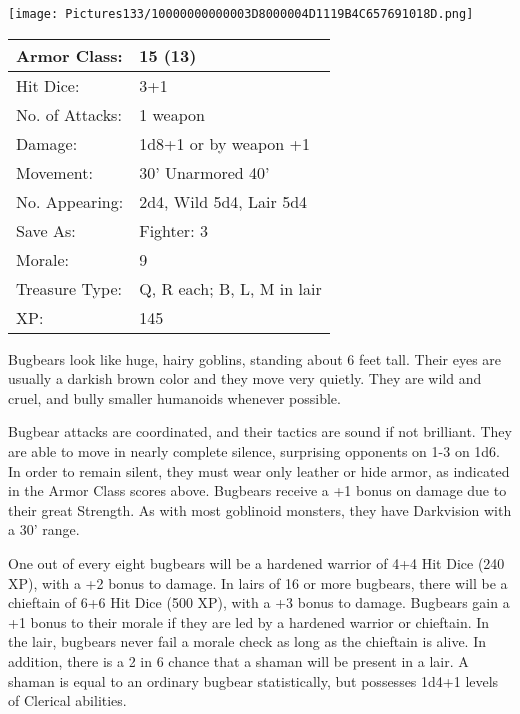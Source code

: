 \documentclass[a4paper,twoside,openany,10pt]{book}
\begin{document}
\begin{multicols}{2}
\begin{center}
\texttt{[image: Pictures133/10000000000003D8000004D1119B4C657691018D.png]}\medskip
\end{center}

\begin{center}
	\begin{tabularx}{0.48\textwidth}{@{}lX@{}}
Armor Class: & 15 (13) \\\hline
Hit Dice: & 3+1 \\\hline
No. of Attacks: & 1 weapon \\\hline
Damage: & 1d8+1 or by weapon +1 \\\hline
Movement: & 30' Unarmored 40' \\\hline
No. Appearing: & 2d4, Wild 5d4, Lair 5d4 \\\hline
Save As: & Fighter: 3 \\\hline
Morale: & 9 \\\hline
Treasure Type: & Q, R each; B, L, M in lair \\\hline
XP: & 145 \\\hline
\end{tabularx}\medskip
\end{center}

Bugbears look like huge, hairy goblins, standing about 6 feet tall. Their eyes are usually a darkish brown color and they move very quietly. They are wild and cruel, and bully smaller humanoids whenever possible. 

Bugbear attacks are coordinated, and their tactics are sound if not brilliant. They are able to move in nearly complete silence, surprising opponents on 1-3 on 1d6. In order to remain silent, they must wear only leather or hide armor, as indicated in the Armor Class scores above. Bugbears receive a +1 bonus on damage due to their great Strength. As with most goblinoid monsters, they have Darkvision with a 30' range.

One out of every eight bugbears will be a hardened warrior of 4+4 Hit Dice (240 XP), with a +2 bonus to damage. In lairs of 16 or more bugbears, there will be a chieftain of 6+6 Hit Dice (500 XP), with a +3 bonus to damage. Bugbears gain a +1 bonus to their morale if they are led by a hardened warrior or chieftain. In the lair, bugbears never fail a morale check as long as the chieftain is alive. In addition, there is a 2 in 6 chance that a shaman will be present in a lair. A shaman is equal to an ordinary bugbear statistically, but possesses 1d4+1 levels of Clerical abilities.\medskip




\end{multicols}
\end{document}

